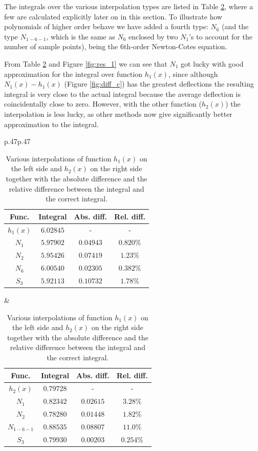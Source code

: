 The integrals over the various interpolation types are listed in Table \ref{tab:res_1}, where a few are calculated explicitly later on in this section.
To illustrate how polynomials of higher order behave we have added a fourth type: $N_6$ (and the type $N_{1-6-1}$, which is the same as $N_6$ enclosed by two $N_1$'s to account for the number of sample points), being the 6th-order Newton-Cotes equation.

From Table \ref{tab:res_1} and Figure \ref{fig:res_1} we can see that $N_1$ got lucky with good approximation for the integral over function $h_1(x)$, since although $N_1(x) - h_1(x)$ (Figure \ref{fig:diff_c}) has the greatest deflections the resulting integral is very close to the actual integral because the average deflection is coincidentally close to zero.
However, with the other function ($h_2(x)$) the interpolation is less lucky, as other methods now give significantly better approximation to the integral.
\begin{table}[H]
    \vspace{-0.5em}
    \centering
    \begin{tabular}{p{}p{}}
        \begin{tabular}{cccc}
            Func. & Integral & Abs. diff. & Rel. diff. \\
            \hline
            $h_1(x)$ & $6.02845$ & - & - \\
            $N_1$    & $5.97902$ & $0.04943$ & $0.820\%$ \\
            $N_2$    & $5.95426$ & $0.07419$ & $1.23\%$ \\
            $N_6$    & $6.00540$ & $0.02305$ & $0.382\%$ \\
            $S_3$    & $5.92113$ & $0.10732$ & $1.78\%$
        \end{tabular} &
        \begin{tabular}{cccc}
            Func. & Integral & Abs. diff. & Rel. diff. \\
            \hline
            $h_2(x)$ & $0.79728$ & - & - \\
            $N_1$    & $0.82342$ & $0.02615$ & $3.28\%$ \\
            $N_2$    & $0.78280$ & $0.01448$ & $1.82\%$ \\
            $N_{1-6-1}$ & $0.88535$ & $0.08807$ & $11.0\%$ \\
            $S_3$    & $0.79930$ & $0.00203$ & $0.254\%$
        \end{tabular}
    \end{tabular}
    \vspace{-.2em}
    \caption{Various interpolations of function $h_1(x)$ on the left side and $h_2(x)$ on the right side together with the absolute difference and the relative difference between the integral and the correct integral.}
    \label{tab:res_1}
    \vspace{-0.5em}
    \centering
\end{table}

